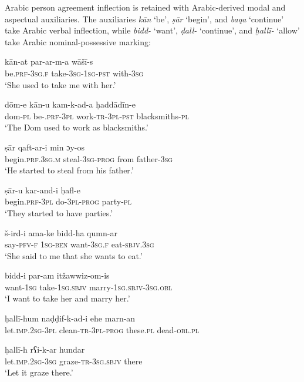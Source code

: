 \documentclass[output=paper]{langsci/langscibook}
\begin{document}
Arabic person agreement inflection is retained with Arabic-derived modal and aspectual auxiliaries. The auxiliaries \textit{kān} ‘be’, \textit{ṣār} ‘begin’, and \textit{baqa} ‘continue’ take Arabic verbal inflection, while \textit{bidd-} ‘want’, \textit{ḍall-} ‘continue’, and \textit{ḫallī-} ‘allow’ take Arabic nominal-possessive marking:

\ea
\ea
\gll kān-at           par-ar-m-a        wāšī-s  \\
     be.\textsc{prf-3sg.f}   take-\textsc{3sg-1sg-pst}  with-\textsc{3sg}\\
\glt ‘She used to take me with her.’

\ex
\gll dōm-e kān-u kam-k-ad-a  {ḥ}addādīn-e\\
     dom-\textsc{pl} be-\textsc{.prf-3pl} work-\textsc{tr-3pl-pst} blacksmiths-\textsc{pl}\\
\glt ‘The Dom used to work as blacksmiths.’
\z
\z

\ea
\ea
\gll ṣār  qaft-ar-i  min  {ɔ}y-os\\
     begin.\textsc{prf.3sg.m} steal-\textsc{3sg-prog} from father-\textsc{3sg}\\
\glt ‘He started to steal from his father.’

\ex
\gll ṣār-u  kar-and-i  ḥafl-e\\
     begin.\textsc{prf-3pl} do-\textsc{3pl}-\textsc{prog}  party-\textsc{pl}\\
\glt ‘They started to have parties.’
\z
\z

\ea
\ea
\gll š-ird-i  ama-ke bidd-ha qumn-ar\\
     say-\textsc{pfv-f} \textsc{1sg-ben} want-\textsc{3sg.f} eat-\textsc{sbjv.3sg}\\
\glt ‘She said to me that she wants to eat.’

\ex
\gll bidd-i  par-am itžawwiz-om-is\\
     want-\textsc{1sg} take-\textsc{1sg.sbjv} marry-\textsc{1sg.sbjv-3sg.obl}\\
\glt ‘I want to take her and marry her.’
\z
\z

\ea
\ea
\gll ḫallī-hum naḍḍif-k-ad-i ehe marn-an  \\
     let.\textsc{imp.2sg-3pl} clean-\textsc{tr-3pl-prog} these.\textsc{pl} dead-\textsc{obl.pl}\\

\ex
\gll ḫallī-h rʕi-k-ar hundar\\
     let.\textsc{imp.2sg}-\textsc{3sg} graze-\textsc{tr-3sg.sbjv} there\\
\glt ‘Let it graze there.’
\z
\z
\end{document}
